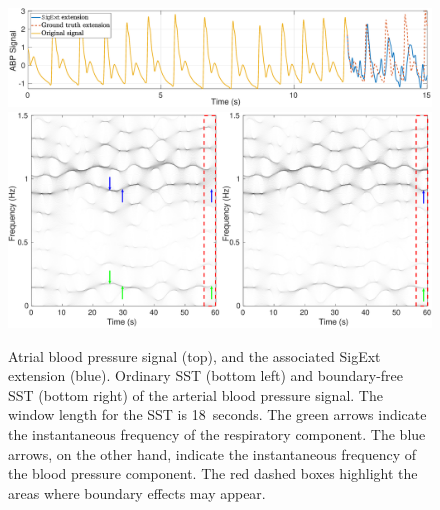 \documentclass[journal,onecolumn]{IEEEtran}
\begin{document}
{\begin{figure}
\centering
\includegraphics[width=\textwidth]{ABP.eps}
\includegraphics[width=\textwidth]{ABPsst.eps}
\caption{Atrial blood pressure signal (top), and the associated
{\sf SigExt} extension (blue). Ordinary SST (bottom left) and boundary-free SST (bottom right) of the arterial blood pressure signal. The window length for the SST is 18~seconds. The green arrows indicate the instantaneous frequency of the respiratory component. The blue arrows, on the other hand, indicate the instantaneous frequency of the blood pressure component. The red dashed boxes highlight the areas where boundary effects may appear.}
\label{fig:abp}
\end{figure} 
}



\end{document}
